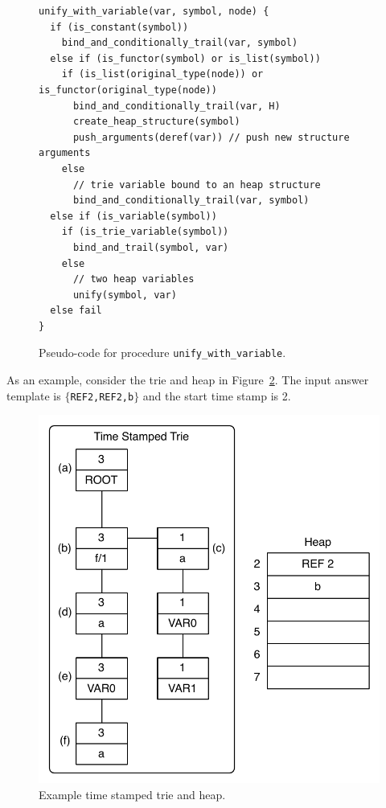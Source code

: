 \begin{figure}[ht]
\begin{Verbatim}
unify_with_variable(var, symbol, node) {
  if (is_constant(symbol))
    bind_and_conditionally_trail(var, symbol)
  else if (is_functor(symbol) or is_list(symbol))
    if (is_list(original_type(node)) or is_functor(original_type(node))
      bind_and_conditionally_trail(var, H)
      create_heap_structure(symbol)
      push_arguments(deref(var)) // push new structure arguments
    else
      // trie variable bound to an heap structure
      bind_and_conditionally_trail(var, symbol)
  else if (is_variable(symbol))
    if (is_trie_variable(symbol))
      bind_and_trail(symbol, var)
    else
      // two heap variables
      unify(symbol, var)
  else fail
}
\end{Verbatim}
\caption{Pseudo-code for procedure \texttt{unify\_with\_variable}.}
\label{fig:unify_with_variable}
\end{figure}

As an example, consider the trie and heap in Figure~\ref{fig:collect_variable}.
The input answer template is $\{$\texttt{REF2,REF2,b}$\}$ and the start time stamp is 2.

\begin{figure}[ht]
  \centering
    \includegraphics[scale=0.6]{collect_variable.pdf}
  \caption{Example time stamped trie and heap.}
  \label{fig:collect_variable}
\end{figure}

